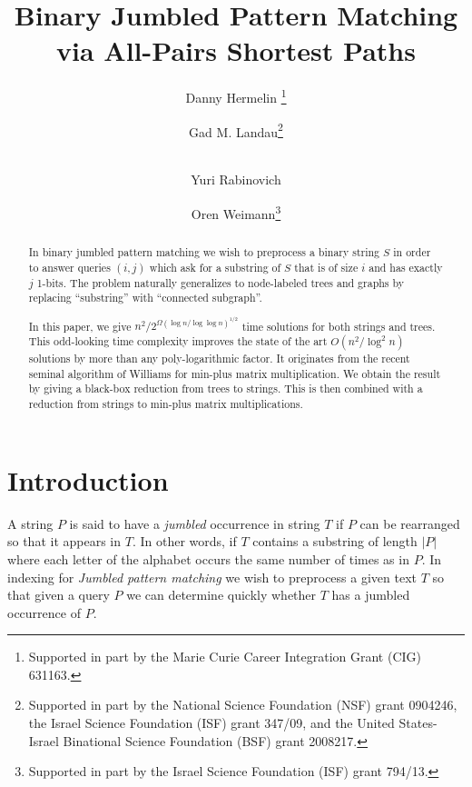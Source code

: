 \documentclass[11pt]{llncs}
\begin{document}
\title{Binary Jumbled Pattern Matching\\ via All-Pairs Shortest Paths}


\author{Danny Hermelin \thanks{Supported in part by the Marie Curie Career Integration Grant (CIG) 631163.}  \and Gad M. Landau\thanks{Supported in part by the National Science Foundation (NSF) grant 0904246, the Israel Science Foundation (ISF) grant 347/09,
and the United States-Israel Binational Science Foundation (BSF) grant 2008217.}  \and \\ Yuri Rabinovich
\and Oren Weimann\thanks{Supported in part by the Israel Science Foundation (ISF) grant 794/13.}}

\maketitle

\begin{abstract}
In binary jumbled pattern matching we wish to preprocess a binary string $S$ in order to answer queries $(i,j)$ which ask for a substring of $S$ that is of size $i$ and  has exactly $j$ 1-bits. The problem naturally generalizes to node-labeled trees and graphs by replacing ``substring'' with ``connected subgraph''.

\hspace{15pt} In this paper, we give  ${n^2}/{2^{\Omega(\log n/\log \log n)^{1/2}}}$ time solutions for both strings and trees. This odd-looking time complexity improves the state of the art $O(n^2/\log^2 n)$ solutions by more than any poly-logarithmic factor. It originates from the recent seminal algorithm of Williams for min-plus matrix multiplication.
We obtain the result by giving a black-box reduction from trees to strings. This is then combined with a  reduction from strings to min-plus matrix multiplications.
\end{abstract}


\section{Introduction}
\label{sec:introduction}

A string $P$ is said to have a {\em jumbled} occurrence in string $T$ if $P$ can be rearranged so that it appears in $T$. In other words, if $T$ contains a substring of length $|P|$ where each letter of the alphabet occurs the same number of times as in $P$.
In indexing for {\em Jumbled pattern matching} we wish to preprocess a given text $T$ so that given a query $P$ we can determine quickly whether $T$ has a jumbled occurrence of $P$.
\end{document}
